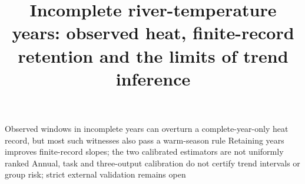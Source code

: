 \documentclass[draft,linenumbers]{agujournal2025}
\begin{document}
\title{Incomplete river-temperature years: observed heat, finite-record retention and the limits of trend inference}
\keypoints
{Observed windows in incomplete years can overturn a complete-year-only heat record, but most such witnesses also pass a warm-season rule}
{Retaining years improves finite-record slopes; the two calibrated estimators are not uniformly ranked}
{Annual, task and three-output calibration do not certify trend intervals or group risk; strict external validation remains open}
\maketitle\par
\end{document}
